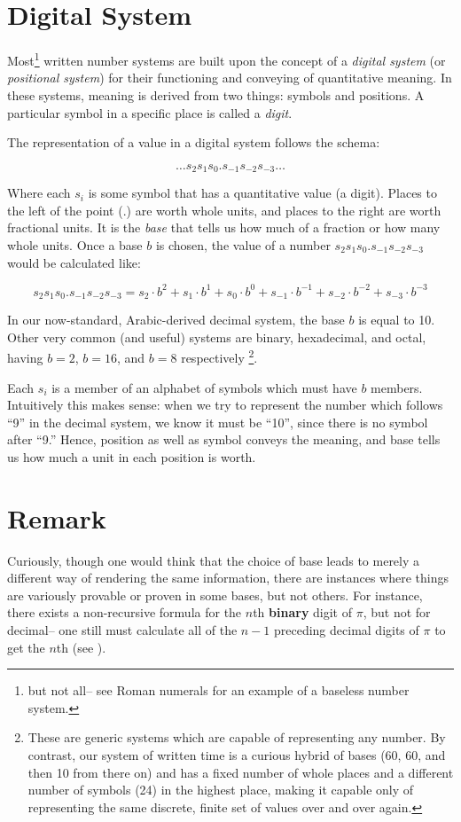 \documentclass[12pt]{article}
\begin{document}

\section{Digital System}

Most\footnote{but not all-- see Roman numerals for an example of a baseless number system.} written number systems are built upon the concept of a \emph{digital system} (or \emph{positional system}) for their functioning and conveying of quantitative meaning.  In these systems, meaning is derived from two things: symbols and positions.  A particular symbol in a specific place is called a \emph{digit}.  

The representation of a value in a digital system follows the schema:

$$ \ldots s_2 s_1 s_0 . s_{-1} s_{-2} s_{-3} \ldots $$

Where each $s_i$ is some symbol that has a quantitative value (a digit).  Places to the left of the point ($.$) are worth whole units, and places to the right are worth fractional units.  It is the \emph{base} that tells us how much of a fraction or how many whole units.  Once a base $b$ is chosen, the value of a number $s_2 s_1 s_0 . s_{-1} s_{-2} s_{-3}$ would be calculated like:

$$ s_2 s_1 s_0 . s_{-1} s_{-2} s_{-3} = s_2 \cdot b^{2} + s_1 \cdot b^{1} + s_0 \cdot b^{0} + s_{-1} \cdot b^{-1} + s_{-2} \cdot b^{-2} + s_{-3} \cdot b^{-3} $$

In our now-standard, Arabic-derived decimal system, the base $b$ is equal to 10.  Other very common (and useful) systems are binary, hexadecimal, and octal, having $b=2$, $b=16$, and $b=8$ respectively \footnote{These are generic systems which are capable of representing any number.  By contrast, our system of written time is a curious hybrid of bases (60, 60, and then 10 from there on) and has a fixed number of whole places and a different number of symbols (24) in the highest place, making it capable only of representing the same discrete, finite set of values over and over again.}.

Each $s_i$ is a member of an alphabet of symbols which must have $b$ members.  Intuitively this makes sense: when we try to represent the number which follows ``9'' in the decimal system, we know it must be ``10'', since there is no symbol after ``9.''  Hence, position as well as symbol conveys the meaning, and base tells us how much a unit in each position is worth.

\section{Remark}

Curiously, though one would think that the choice of base leads to merely a different way of rendering the same information, there are instances where things are variously provable or proven in some bases, but not others. For instance, there exists a non-recursive formula for the $n$th \textbf{binary} digit of $\pi$, but not for decimal-- one still must calculate all of the $n-1$ preceding decimal digits of $\pi$ to get the $n$th (see ).
\end{document}
